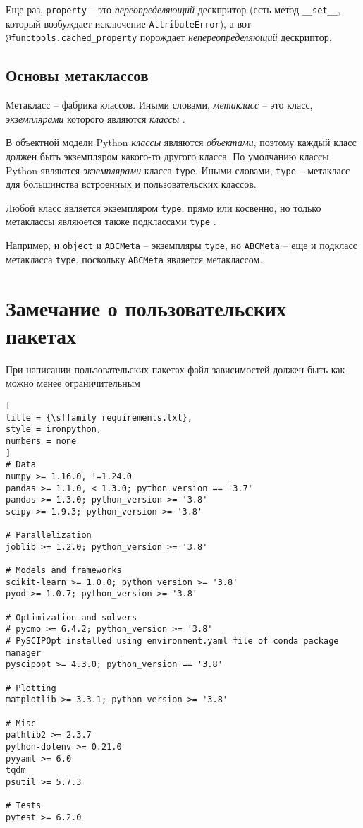 \documentclass[%
	11pt,
	a4paper,
	utf8,
		]{article}
\begin{document}
Еще раз, \verb*|property| -- это \emph{переопределяющий} дескпритор (есть метод \verb|__set__|, который возбуждает исключение \verb*|AttributeError|), а вот \verb|@functools.cached_property| порождает \emph{непереопределяющий} дескриптор.

\subsection{Основы метаклассов}

Метакласс -- фабрика классов. Иными словами, \emph{метакласс} -- это класс, \emph{экземплярами} которого являются \emph{классы} \cite[]{ramalho:python-2022}.

В объектной модели Python \emph{классы} являются \emph{объектами}, поэтому каждый класс должен быть экземпляром какого-то другого класса. По умолчанию классы Python являются \emph{экземплярами} класса \verb*|type|. Иными словами, \verb|type| -- метакласс для большинства встроенных и пользовательских классов.

Любой класс является экземпляром \verb*|type|, прямо или косвенно, но только метаклассы являюется также подклассами \verb|type| \cite[]{ramalho:python-2022}.

Например, и \verb*|object| и \verb|ABCMeta| -- экземпляры \verb*|type|, но \verb|ABCMeta| -- еще и подкласс метакласса \verb*|type|, поскольку \verb|ABCMeta| является метаклассом.






\section{Замечание о пользовательских пакетах}

При написании пользовательских пакетах файл зависимостей должен быть как можно менее ограничительным
\begin{lstlisting}[
title = {\sffamily requirements.txt},
style = ironpython,
numbers = none
]
# Data
numpy >= 1.16.0, !=1.24.0
pandas >= 1.1.0, < 1.3.0; python_version == '3.7'
pandas >= 1.3.0; python_version >= '3.8'
scipy >= 1.9.3; python_version >= '3.8'

# Parallelization
joblib >= 1.2.0; python_version >= '3.8'

# Models and frameworks
scikit-learn >= 1.0.0; python_version >= '3.8'
pyod >= 1.0.7; python_version >= '3.8'

# Optimization and solvers
# pyomo >= 6.4.2; python_version >= '3.8'
# PySCIPOpt installed using environment.yaml file of conda package manager
pyscipopt >= 4.3.0; python_version == '3.8'

# Plotting
matplotlib >= 3.3.1; python_version >= '3.8'

# Misc
pathlib2 >= 2.3.7
python-dotenv >= 0.21.0
pyyaml >= 6.0
tqdm
psutil >= 5.7.3

# Tests
pytest >= 6.2.0
\end{lstlisting}
\end{document}
